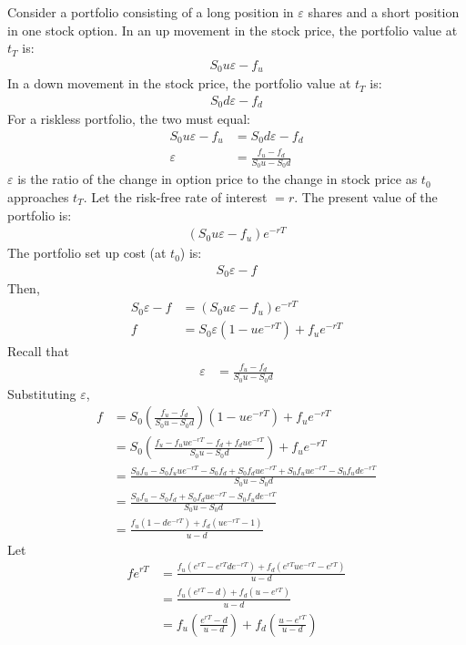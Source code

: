 \documentclass[12pt]{article}
\begin{document}
Consider a portfolio consisting of a long position in $\varepsilon$ shares and a short position in one stock option. In an up movement in the stock price, the portfolio value at $t_{T}$ is:
\begin{align*}
S_{0}u\varepsilon-f_{u}
\end{align*}
In a down movement in the stock price, the portfolio value at $t_{T}$ is:
\begin{align*}
S_{0}d\varepsilon-f_{d}
\end{align*}
For a riskless portfolio, the two must equal:
\begin{align*}
S_{0}u\varepsilon-f_{u}&=S_{0}d\varepsilon-f_{d}\\
\varepsilon&=\frac{f_{u}-f_{d}}{S_{0}u-S_{0}d}
\end{align*}
$\varepsilon$ is the ratio of the change in option price to the change in stock price as $t_{0}$ approaches $t_{T}$. Let the risk-free rate of interest $=r$. The present value of the portfolio is:
\begin{align*}
(S_{0}u\varepsilon-f_{u})e^{-rT}
\end{align*}
The portfolio set up cost (at $t_{0}$) is:
\begin{align*}
S_{0}\varepsilon-f
\end{align*}
Then,
\begin{align*}
S_{0}\varepsilon-f&=(S_{0}u\varepsilon-f_{u})e^{-rT}\\
f&=S_{0}\varepsilon(1-ue^{-rT})+f_{u}e^{-rT}
\end{align*}
Recall that
\begin{align*}
\varepsilon&=\frac{f_{u}-f_{d}}{S_{0}u-S_{0}d}
\end{align*}
Substituting $\varepsilon$,
\begin{align*}
f&=S_{0}\left(\frac{f_{u}-f_{d}}{S_{0}u-S_{0}d}\right)(1-ue^{-rT})+f_{u}e^{-rT}\\
&=S_{0}\left(\frac{f_{u}-f_{u}ue^{-rT}-f_{d}+f_{d}ue^{-rT}}{S_{0}u-S_{0}d}\right)+f_{u}e^{-rT}\\
&=\frac{S_{0}f_{u}-S_{0}f_{u}ue^{-rT}-S_{0}f_{d}+S_{0}f_{d}ue^{-rT}+S_{0}f_{u}ue^{-rT}-S_{0}f_{u}de^{-rT}}{S_{0}u-S_{0}d}\\
&=\frac{S_{0}f_{u}-S_{0}f_{d}+S_{0}f_{d}ue^{-rT}-S_{0}f_{u}de^{-rT}}{S_{0}u-S_{0}d}\\
&=\frac{f_{u}(1-de^{-rT})+f_{d}(ue^{-rT}-1)}{u-d}
\end{align*}
Let
\begin{align*}
fe^{rT}&=\frac{f_{u}(e^{rT}-e^{rT}de^{-rT})+f_{d}(e^{rT}ue^{-rT}-e^{rT})}{u-d}\\
&=\frac{f_{u}(e^{rT}-d)+f_{d}(u-e^{rT})}{u-d}\\
&=f_{u}\left(\frac{e^{rT}-d}{u-d}\right)+f_{d}\left(\frac{u-e^{rT}}{u-d}\right)
\end{align*}
\end{document}
